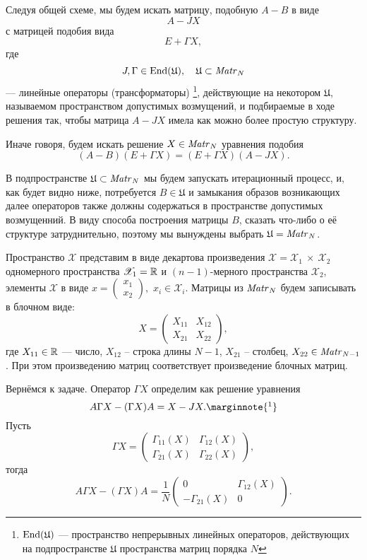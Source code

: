 Следуя общей схеме, мы будем искать матрицу, подобную \( A - B \)
в виде
\[ A - J X \]
с матрицей подобия вида
\[ E + \Gamma X ,\]
где
\[ J, \Gamma \in \mathrm{End}({\mathfrak U}),\quad \mathfrak{U}\subset\mathit{Matr}_{N} {} \]
--- линейные операторы (трансформаторы)
\footnote{\( \mathrm{End}({\mathfrak U}) \) --- пространство непрерывных линейных операторов,
действующих на подпространстве \( \mathfrak U \) пространства матриц порядка \( N \)},
действующие на некотором \( \mathfrak U \),
называемом пространством допустимых возмущений,
и подбираемые в ходе решения так, чтобы матрица \( A - JX \)
имела как можно более простую структуру.

Иначе говоря, будем искать решение \( X \in\mathit{Matr}_{N} {} \)
уравнения подобия
\begin{equation}\label{eq:similarity-orig}
    (A - B)(E+\Gamma X) = (E+\Gamma X) (A - JX).
\end{equation}

В подпространстве \( \mathfrak U \subset \mathit{Matr}_{N} {} \)
мы будем запускать итерационный процесс,
и, как будет видно ниже, потребуется \( B \in \mathfrak U \)
и замыкания образов возникающих далее операторов также
должны содержаться в
пространстве допустимых возмущенний.
В виду способа построения матрицы \( B \), сказать что-либо о её структуре затруднительно,
поэтому мы вынуждены выбрать \( \mathfrak U = \mathit{Matr}_{N} {}\).

Пространство \( \mathscr{X} \) представим в виде
декартова произведения
\( \mathscr{X} = \mathscr{X}_1~\times~\mathscr{X}_2 \)
одномерного пространства \( \mathscr{X}_1=\mathbb{R} \)
и \((n-1)\)-мерного пространства \( \mathscr{X}_2 \),
элементы \( \mathscr{X} \) в виде
\( x=\begin{pmatrix}x_1\\x_2\end{pmatrix}, \)
\( x_i\in\mathscr{X}_i \).
Матрицы из \( \mathit{Matr}_{N} {} \) будем записывать
в блочном виде:
\[
    X = \begin{pmatrix}
    X_{11} & X_{12} \\
    X_{21} & X_{22}
    \end{pmatrix},
    \]
где \( { X_{11}\in\mathbb{R} } \) --- число,
    \( X_{12} \) -- строка длины \( N-1 \),
    \( X_{21} \) -- столбец,
    \( {X_{22} \in \mathit{Matr}_{N-1} {}} \).
При этом произведению матриц соответствует произведение блочных матриц.

Вернёмся к задаче.
Оператор \( \Gamma X \) определим как решение уравнения
\[
    A\Gamma X - (\Gamma X) A = X - JX.
    \marginnote{
        \footnotemark}
    \]
Пусть
\[ \Gamma X =
\begin{pmatrix}
    \Gamma_{11}(X) & \Gamma_{12}(X) \\
    \Gamma_{21}(X) & \Gamma_{22}(X)
\end{pmatrix}, \]
тогда
\[
    A \Gamma X - (\Gamma X) A =
    \frac{1}{N}
\begin{pmatrix}
    0               & \Gamma_{12}(X) \\
    -\Gamma_{21}(X) & 0
\end{pmatrix}
    . \]

